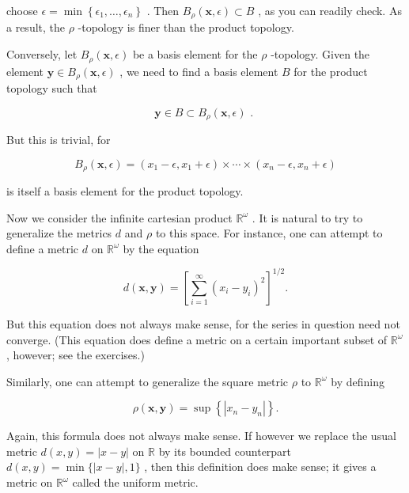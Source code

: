 choose \(\epsilon  = \min \left\{  {{\epsilon }_{1},\ldots ,{\epsilon }_{n}}\right\}\) . Then \({B}_{\rho }\left( {\mathbf{x},\epsilon }\right)  \subset  B\) , as you can readily check. As a result, the \(\rho\) -topology is finer than the product topology.

Conversely, let \({B}_{\rho }\left( {\mathbf{x},\epsilon }\right)\) be a basis element for the \(\rho\) -topology. Given the element \(\mathbf{y} \in  {B}_{\rho }\left( {\mathbf{x},\epsilon }\right)\) , we need to find a basis element \(B\) for the product topology such that

\[
\mathbf{y} \in  B \subset  {B}_{\rho }\left( {\mathbf{x},\epsilon }\right) \text{ . }
\]

But this is trivial, for

\[
{B}_{\rho }\left( {\mathbf{x},\epsilon }\right)  = \left( {{x}_{1} - \epsilon ,{x}_{1} + \epsilon }\right)  \times  \cdots  \times  \left( {{x}_{n} - \epsilon ,{x}_{n} + \epsilon }\right)
\]

is itself a basis element for the product topology.

Now we consider the infinite cartesian product \({\mathbb{R}}^{\omega }\) . It is natural to try to generalize the metrics \(d\) and \(\rho\) to this space. For instance, one can attempt to define a metric \(d\) on \({\mathbb{R}}^{\omega }\) by the equation

\[
d\left( {\mathbf{x},\mathbf{y}}\right)  = {\left\lbrack  \mathop{\sum }\limits_{{i = 1}}^{\infty }{\left( {x}_{i} - {y}_{i}\right) }^{2}\right\rbrack  }^{1/2}.
\]

But this equation does not always make sense, for the series in question need not converge. (This equation does define a metric on a certain important subset of \({\mathbb{R}}^{\omega }\) , however; see the exercises.)

Similarly, one can attempt to generalize the square metric \(\rho\) to \({\mathbb{R}}^{\omega }\) by defining

\[
\rho \left( {\mathbf{x},\mathbf{y}}\right)  = \sup \left\{  \left| {{x}_{n} - {y}_{n}}\right| \right\}  .
\]

Again, this formula does not always make sense. If however we replace the usual metric \(d\left( {x,y}\right)  = \left| {x - y}\right|\) on \(\mathbb{R}\) by its bounded counterpart \(d\left( {x,y}\right)  = \min \{ \left| {x - y}\right| ,1\}\) , then this definition does make sense; it gives a metric on \({\mathbb{R}}^{\omega }\) called the uniform metric.

